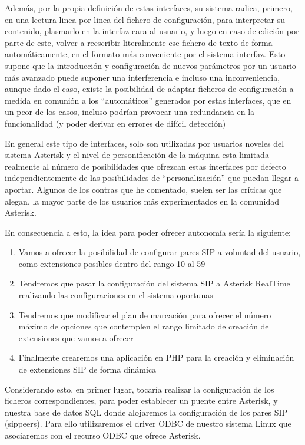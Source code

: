 Además, por la propia definición de estas interfaces, su sistema radica, primero, en una lectura linea por linea del fichero de configuración, para interpretar su contenido, plasmarlo en la interfaz cara al usuario, y luego en caso de edición por parte de este, volver a reescribir literalmente ese fichero de texto de forma automáticamente, en el formato más conveniente por el sistema interfaz. Esto supone que la introducción y configuración de nuevos parámetros por un usuario más avanzado puede suponer una interferencia e incluso una inconveniencia, aunque dado el caso, existe la posibilidad de adaptar ficheros de configuración a medida en comunión a los ``automáticos'' generados por estas interfaces, que en un peor de los casos, incluso podrían provocar una redundancia en la funcionalidad (y poder derivar en errores de difícil detección)

En general este tipo de interfaces, solo son utilizadas por usuarios noveles del sistema Asterisk y el nivel de personificación de la máquina esta limitada realmente al número de posibilidades que ofrezcan estas interfaces por defecto independientemente de las posibilidades de ``personalización'' que puedan llegar a aportar. Algunos de los contras que he comentado, suelen ser las críticas que alegan, la mayor parte de los usuarios más experimentados en la comunidad Asterisk.

En consecuencia a esto, la idea para poder ofrecer autonomía sería la siguiente:

\begin{enumerate}

\item {Vamos a ofrecer la posibilidad de configurar pares SIP a voluntad del usuario, como extensiones posibles dentro del rango 10 al 59}
\item {Tendremos que pasar la configuración del sistema SIP a Asterisk RealTime realizando las configuraciones en el sistema oportunas}
\item {Tendremos que modificar el plan de marcación para ofrecer el número máximo de opciones que contemplen el rango limitado de creación de extensiones que vamos a ofrecer}
\item {Finalmente crearemos una aplicación en PHP para la creación y eliminación de extensiones SIP de forma dinámica}

\end{enumerate}

Considerando esto, en primer lugar, tocaría realizar la configuración de los ficheros correspondientes, para poder establecer un puente entre Asterisk, y nuestra base de datos SQL donde alojaremos la configuración de los pares SIP (sippeers). Para ello utilizaremos el driver ODBC de nuestro sistema Linux que asociaremos con el recurso ODBC que ofrece Asterisk.


